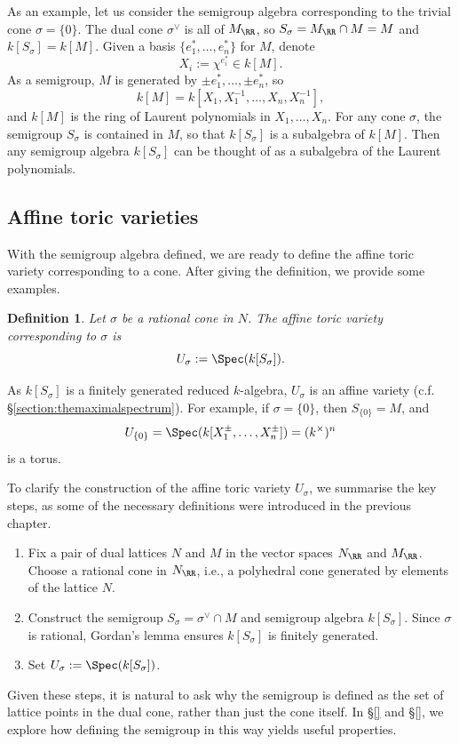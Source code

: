 \documentclass[12pt]{amsart}
\theoremstyle{plain}
\newtheorem{definition}[theorem]{Definition}
\begin{document}
As an example, let us consider the semigroup algebra corresponding to the trivial cone $\sigma = \{0\}$.
The dual cone $\sigma^\vee$ is all of $M_\RR$, so $S_\sigma = M_\RR \cap M = M$ and $k[S_\sigma]=k[M]$. 
Given a basis $\{e_1^*, \ldots, e_n^*\}$ for $M$, denote
$$X_i := \chi^{e_i^*} \in k[M].$$
As a semigroup, $M$ is generated by $\pm e_1^*, \ldots, \pm e_n^*$, so
$$k[M] = k[X_1, X_1^{-1}, \ldots, X_n, X_n^{-1}],$$
and $k[M]$ is the ring of Laurent polynomials in $X_1, \ldots, X_n$.
For any cone $\sigma$, the semigroup $S_\sigma$ is contained in $M$, so that $k[S_\sigma]$ is a subalgebra of $k[M]$. 
Then any semigroup algebra $k[S_\sigma]$ can be thought of as a subalgebra of the Laurent polynomials.





\subsection{Affine toric varieties}\label{section:affinetoricvarieties}
With the semigroup algebra defined, we are ready to define the affine toric variety corresponding to a cone.
After giving the definition, we provide some examples.

\begin{definition}
Let $\sigma$ be a rational cone in $N$.
The affine toric variety corresponding to $\sigma$ is
$$U_\sigma := \Spec(k[S_\sigma]).$$
\end{definition}

As $k[S_\sigma]$ is a finitely generated reduced $k$-algebra, $U_\sigma$ is an affine variety (c.f. \S \ref{section:themaximalspectrum}).
For example, if $\sigma = \{0\}$, then $S_{\{0\}}= M$, and
$$U_{\{0\}} = \Spec(k[X_1^\pm, \ldots, X_n^\pm]) = (k^\times)^n$$
is a torus.

To clarify the construction of the affine toric variety $U_\sigma$, we summarise the key steps, as some of the necessary definitions were introduced in the previous chapter.
\begin{enumerate}
\item Fix a pair of dual lattices $N$ and $M$ in the vector spaces $N_\RR$ and $M_\RR$.
Choose a rational cone in $N_\RR$, i.e., a polyhedral cone generated by elements of the lattice $N$.
\item Construct the semigroup $S_\sigma = \sigma^\vee \cap M$ and semigroup algebra $k[S_\sigma]$.
Since $\sigma$ is rational, Gordan's lemma ensures $k[S_\sigma]$ is finitely generated.
\item Set $U_\sigma := \Spec(k[S_\sigma])$.
\end{enumerate}
Given these steps, it is natural to ask why the semigroup is defined as the set of lattice points in the dual cone, rather than just the cone itself.
In \S \ref{} and \S \ref{}, we explore how defining the semigroup in this way yields useful properties.
\end{document}
